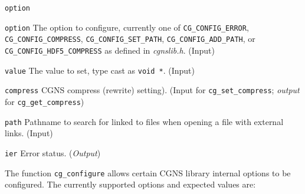 \begin{Ventryi}{\texttt{option}}\raggedright
\item [\texttt{option}]
      The option to configure, currently one of
      \texttt{CG\_CONFIG\_ERROR}, \texttt{CG\_CONFIG\_COMPRESS},
      \texttt{CG\_CONFIG\_SET\_PATH}, \texttt{CG\_CONFIG\_ADD\_PATH},
      or \texttt{CG\_CONFIG\_HDF5\_COMPRESS}
      as defined in \textit{cgnslib.h}.
      (\textcolor{input}{Input})
\item [\texttt{value}]
      The value to set, type cast as \texttt{void *}.
      (\textcolor{input}{Input})
\item [\texttt{compress}]
      CGNS compress (rewrite) setting).
      (\textcolor{input}{Input} for \texttt{cg\_set\_compress}; \textcolor{output}{\textit{output}} for
      \texttt{cg\_get\_compress})
\item [\texttt{path}]
      Pathname to search for linked to files when opening a file with external links.
      (\textcolor{input}{Input})
\item [\texttt{ier}]
      Error status.
      (\textcolor{output}{\textit{Output}})
\end{Ventryi}

The function \texttt{cg\_configure} allows certain CGNS library internal
options to be configured.
The currently supported options and expected values are:

